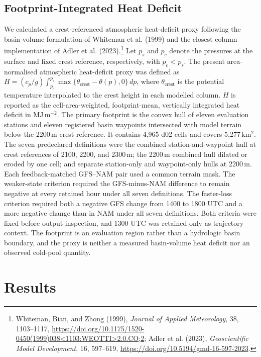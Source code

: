 \documentclass[air,article,submit,moreauthors]{Definitions/mdpi}
\begin{document}
\subsection{Footprint-Integrated Heat Deficit}
\label{sec:v3-heatdeficit-methods}

We calculated a crest-referenced atmospheric heat-deficit proxy following the basin-volume formulation of Whiteman et al. (1999) and the closest column implementation of Adler et al. (2023).\footnote{Whiteman, Bian, and Zhong (1999), \emph{Journal of Applied Meteorology}, 38, 1103--1117, \url{https://doi.org/10.1175/1520-0450(1999)038<1103:WEOTTI>2.0.CO;2}; Adler et al. (2023), \emph{Geoscientific Model Development}, 16, 597--619, \url{https://doi.org/10.5194/gmd-16-597-2023}.}
Let $p_{s}$ and $p_{c}$ denote the pressures at the surface and fixed crest reference, respectively, with $p_{c}<p_{s}$.
The present area-normalised atmospheric heat-deficit proxy was defined as $H=(c_{p}/g)\int_{p_{c}}^{p_{s}}\max\{\theta_{\mathrm{crest}}-\theta(p),0\}\,dp$, where $\theta_{\mathrm{crest}}$ is the potential temperature interpolated to the crest height in each modelled column.
$H$ is reported as the cell-area-weighted, footprint-mean, vertically integrated heat deficit in MJ\,m$^{-2}$.
The primary footprint is the convex hull of eleven evaluation stations and eleven registered basin waypoints intersected with model terrain below the 2200\,m crest reference.
It contains 4,965 d02 cells and covers 5,277\,km$^{2}$.
The seven predeclared definitions were the combined station-and-waypoint hull at crest references of 2100, 2200, and 2300\,m; the 2200\,m combined hull dilated or eroded by one cell; and separate station-only and waypoint-only hulls at 2200\,m.
Each feedback-matched GFS--NAM pair used a common terrain mask.
The weaker-state criterion required the GFS-minus-NAM difference to remain negative at every retained hour under all seven definitions.
The faster-loss criterion required both a negative GFS change from 1400 to 1800 UTC and a more negative change than in NAM under all seven definitions.
Both criteria were fixed before output inspection, and 1300 UTC was retained only as trajectory context.
The footprint is an evaluation region rather than a hydrologic basin boundary, and the proxy is neither a measured basin-volume heat deficit nor an observed cold-pool quantity.

\section{Results}
\label{sec:v3-results}
\end{document}
